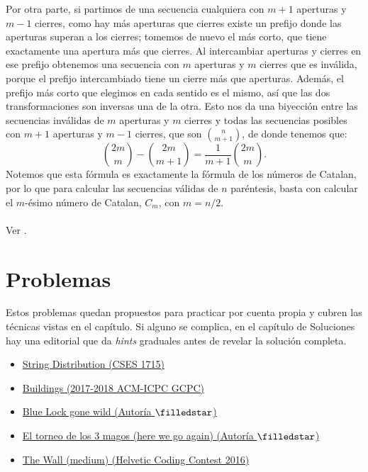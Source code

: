   Por otra parte, si partimos de una secuencia cualquiera con $m+1$ aperturas y $m-1$ cierres, como hay más aperturas que cierres existe un prefijo donde las aperturas superan a los cierres; tomemos de nuevo el más corto, que tiene exactamente una apertura más que cierres. Al intercambiar aperturas y cierres en ese prefijo obtenemos una secuencia con $m$ aperturas y $m$ cierres que es inválida, porque el prefijo intercambiado tiene un cierre más que aperturas. Además, el prefijo más corto que elegimos en cada sentido es el mismo, así que las dos transformaciones son inversas una de la otra. Esto nos da una biyección entre las secuencias inválidas de $m$ aperturas y $m$ cierres y todas las secuencias posibles con $m+1$ aperturas y $m-1$ cierres, que son $\binom{n}{m+1}$, de donde tenemos que:
  \[
  \binom{2m}{m}-\binom{2m}{m+1}=\frac{1}{m+1}\binom{2m}{m}.
  \]
  Notemos que esta fórmula es exactamente la fórmula de los números de Catalan, por lo que para calcular las secuencias válidas de $n$ paréntesis, basta con calcular el $m$-ésimo número de Catalan, $C_m$, con $m=n/2$.
\\\\
Ver .
\section{Problemas}

Estos problemas quedan propuestos para practicar por cuenta propia y cubren las técnicas vistas en el capítulo. Si alguno se complica, en el capítulo de Soluciones hay una editorial que da \textit{hints} graduales antes de revelar la solución completa.

\begin{itemize}
    \item[7.11.1] \href{https://cses.fi/problemset/task/1715/}{String Distribution (CSES 1715)}
    \item[7.11.2] \href{https://codeforces.com/gym/101873/problem/B}{Buildings (2017-2018 ACM-ICPC GCPC)}
    \item[7.11.3] \href{https://codeforces.com/group/DH4HPwQlLU/contest/689800/problem/D}{Blue Lock gone wild (Autoría $\filledstar$)}
    \item[7.11.4] \href{https://codeforces.com/group/DH4HPwQlLU/contest/689800/problem/E}{El torneo de los 3 magos (here we go again) (Autoría $\filledstar$)}
    \item[7.11.5] \href{https://codeforces.com/problemset/problem/690/D2}{The Wall (medium) (Helvetic Coding Contest 2016)}  
\end{itemize}
